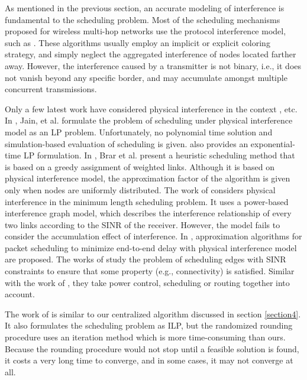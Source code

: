 \documentclass[conference]{IEEEtran}
\begin{document}
As mentioned in the previous section, an accurate modeling of
interference is fundamental to the scheduling problem. Most of the
scheduling mechanisms proposed for wireless multi-hop networks use
the protocol interference model, such as
\cite{hajek1988lsp,kumar2004eep,moscibroda2005cur,ramanathan1993sam,sharma2006csw}.
These algorithms usually employ an implicit or explicit coloring
strategy, and simply neglect the aggregated interference of nodes
located farther away. However, the interference caused by a
transmitter is not binary, i.e., it does not vanish beyond any
specific border, and may accumulate amongst multiple concurrent
transmissions.



Only a few latest work have considered physical interference in the
context
\cite{jain2005iim,gronkvist2004tos,brar2006ces,behzad2007oil,chafekar2007cross,moscibroda2006complexity,moscibroda2006topology,chafekar2008approximation,moscibroda2007optimal},
etc. In \cite{jain2005iim}, Jain, et al. formulate the problem of
scheduling under physical interference model as an LP problem.
Unfortunately, no polynomial time solution and simulation-based
evaluation of scheduling is given. \cite{gronkvist2004tos} also
provides an exponential-time LP formulation. In \cite{brar2006ces},
Brar et al. present a heuristic scheduling method that is based on a
greedy assignment of weighted links. Although it is based on
physical interference model, the approximation factor of the
algorithm is given only when nodes are uniformly distributed. The
work of \cite{behzad2007oil} considers physical interference in the
minimum length scheduling problem. It uses a power-based
interference graph model, which describes the interference
relationship of every two links according to the SINR of the
receiver. However, the model fails to consider the accumulation
effect of interference. In \cite{chafekar2007cross}, approximation
algorithms for packet scheduling to minimize end-to-end delay with
physical interference model are proposed. The works of
\cite{moscibroda2006complexity,moscibroda2006topology} study the
problem of scheduling edges with SINR constraints to ensure that
some property (e.g., connectivity) is satisfied. Similar with the
work of \cite{chafekar2008approximation,moscibroda2007optimal}, they
take power control, scheduling or routing together into account.

The work of \cite{friderikos2006non} is similar to our centralized
algorithm discussed in section \ref{section4}. It also formulates
the scheduling problem as ILP, but the randomized rounding procedure
uses an iteration method which is more time-consuming than ours.
Because the rounding procedure would not stop until a feasible
solution is found, it costs a very long time to converge, and in
some cases, it may not converge at all.
\end{document}
